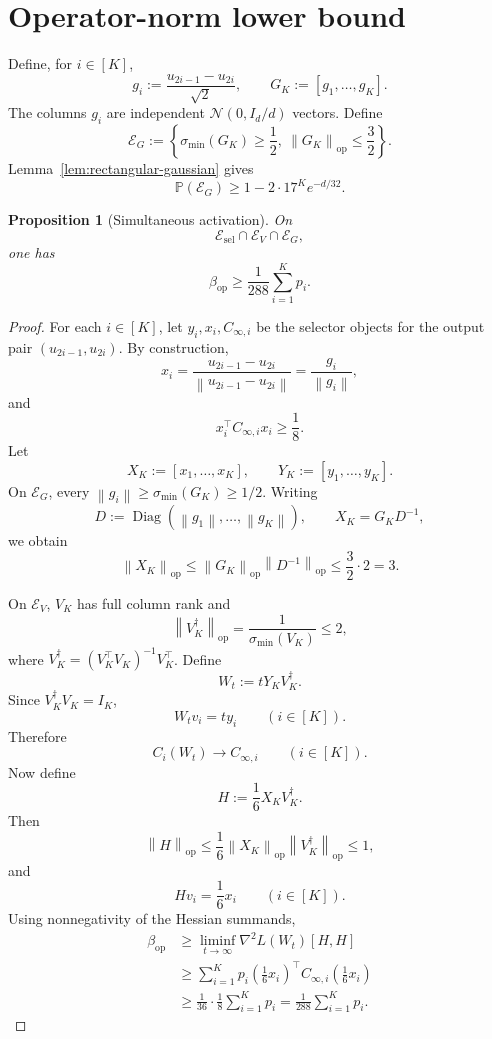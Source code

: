 \documentclass[11pt]{article}
\newtheorem{proposition}[theorem]{Proposition}
\newcommand{\Pp}{\mathbb{P}}
\newcommand{\1}{\mathbf{1}}
\newcommand{\op}{\mathrm{op}}
\newcommand{\Diag}{\operatorname{Diag}}
\newcommand{\norm}[1]{\left\|#1\right\|}
\begin{document}
\section{Operator-norm lower bound}
\label{sec:operator-lower}

Define, for \(i\in[K]\),
\[
 g_i:=\frac{u_{2i-1}-u_{2i}}{\sqrt2},
 \qquad
 G_K:=[g_1,\ldots,g_K].
\]
The columns \(g_i\) are independent \(\mathcal N(0,I_d/d)\) vectors.  Define
\[
 \mathcal E_G
 :=
 \left\{
 \sigma_{\min}(G_K)\ge\frac12,
 \ \norm{G_K}_{\op}\le\frac32
 \right\}.
\]
Lemma~\ref{lem:rectangular-gaussian} gives
\begin{equation}
 \Pp(\mathcal E_G)
 \ge1-2\cdot17^K e^{-d/32}.
 \label{eq:EG-probability}
\end{equation}

\begin{proposition}[Simultaneous activation]
\label{prop:simultaneous-activation}
On
\[
 \mathcal E_{\mathrm{sel}}\cap\mathcal E_V\cap\mathcal E_G,
\]
one has
\[
 \beta_{\op}\ge\frac1{288}\sum_{i=1}^K p_i.
\]
\end{proposition}

\begin{proof}
For each \(i\in[K]\), let \(y_i,x_i,C_{\infty,i}\) be the selector objects
for the output pair \((u_{2i-1},u_{2i})\).  By construction,
\[
 x_i=\frac{u_{2i-1}-u_{2i}}{\norm{u_{2i-1}-u_{2i}}}
 =\frac{g_i}{\norm{g_i}},
\]
and
\[
 x_i^\top C_{\infty,i}x_i\ge\frac18.
\]
Let
\[
 X_K:=[x_1,\ldots,x_K],
 \qquad
 Y_K:=[y_1,\ldots,y_K].
\]
On \(\mathcal E_G\), every \(\norm{g_i}\ge\sigma_{\min}(G_K)\ge1/2\).
Writing
\[
 D:=\Diag(\norm{g_1},\ldots,\norm{g_K}),
 \qquad
 X_K=G_KD^{-1},
\]
we obtain
\[
 \norm{X_K}_{\op}
 \le
 \norm{G_K}_{\op}\norm{D^{-1}}_{\op}
 \le
 \frac32\cdot2=3.
\]

On \(\mathcal E_V\), \(V_K\) has full column rank and
\[
 \norm{V_K^\dagger}_{\op}
 =\frac1{\sigma_{\min}(V_K)}
 \le2,
\]
where \(V_K^\dagger=(V_K^\top V_K)^{-1}V_K^\top\).  Define
\[
 W_t:=tY_KV_K^\dagger.
\]
Since \(V_K^\dagger V_K=I_K\),
\[
 W_tv_i=ty_i
 \qquad (i\in[K]).
\]
Therefore
\[
 C_i(W_t)\longrightarrow C_{\infty,i}
 \qquad (i\in[K]).
\]
Now define
\[
 H:=\frac16X_KV_K^\dagger.
\]
Then
\[
 \norm{H}_{\op}
 \le
 \frac16\norm{X_K}_{\op}\norm{V_K^\dagger}_{\op}
 \le1,
\]
and
\[
 Hv_i=\frac16x_i
 \qquad (i\in[K]).
\]
Using nonnegativity of the Hessian summands,
\begin{align*}
 \beta_{\op}
 &\ge
 \liminf_{t\to\infty}\nabla^2L(W_t)[H,H]\\
 &\ge
 \sum_{i=1}^K p_i
 \left(\frac16x_i\right)^\top
 C_{\infty,i}
 \left(\frac16x_i\right)\\
 &\ge
 \frac1{36}\cdot\frac18\sum_{i=1}^Kp_i
 =
 \frac1{288}\sum_{i=1}^Kp_i.
\end{align*}
\end{proof}
\end{document}
